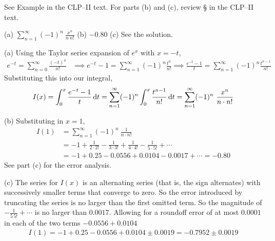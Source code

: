 \begin{hint}
See Example  in the
CLP--II text.
For parts (b) and (c), review  \S {} in the
CLP--II text.

\end{hint}

\begin{answer}
(a) $\displaystyle\sum\limits_{n=1}^\infty (-1)^n\ \frac{x^n}{n\ n!}$
\qquad  (b)
$-0.80$
\qquad
(c) See the solution.
\end{answer}

\begin{solution} (a) Using the Taylor series expansion of $e^x$ with $x=-t$,
\begin{align*}
e^{-t} =\sum_{n=0}^\infty \frac{(-t)^n}{n!}
&\implies e^{-t}-1 =\sum_{n=1}^\infty (-1)^n\frac{t^n}{n!}
\implies \frac{e^{-t}-1}{t} =\sum_{n=1}^\infty (-1)^n\frac{t^{n-1}}{n!}
\end{align*}
Substituting this into our integral,
\begin{align*}
I(x)
=\int_0^x\frac{e^{-t}-1}{t}\,\mathrm{d}t
=\sum_{n=1}^\infty (-1)^n\int_0^x \frac{t^{n-1}}{n!}\,\mathrm{d}t
=\sum_{n=1}^\infty (-1)^n\ \frac{x^n}{n\cdot n!}
\end{align*}

\noindent (b)  Substituting in $x=1$,
\begin{align*}
I(1)&=\sum_{n=1}^\infty (-1)^n\ \frac{1}{n\cdot n!}\\
&=-1+\frac{1}{2\cdot 2!}-\frac{1}{3\cdot 3!}+\frac{1}{4\cdot 4!}-\frac{1}{5\cdot 5!}
+\cdots\\
&=-1+0.25-0.0556+0.0104-0.0017+\cdots
=-0.80
\end{align*}
See part (c) for the error analysis.

\noindent (c)
The series for $I(x)$ is an alternating series (that is, the sign alternates)
with successively smaller terms that converge to zero. So the error introduced by truncating
the series is no larger than the first omitted term. So the magnitude of
$-\frac{1}{5\,5!}+\cdots$ is no larger than $0.0017$. Allowing for a roundoff
error of at most $0.0001$ in each of the two terms $-0.0556+0.0104$
\begin{align*}
I(1)=-1+0.25-0.0556+0.0104\pm 0.0019=-0.7952\pm 0.0019
\end{align*}

\end{solution}


